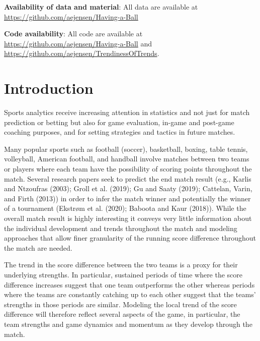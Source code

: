 \documentclass[
  11pt,
]{svjour3}
\theoremstyle{nonumberplain}
\begin{document}
\textbf{Availability of data and material}: All data are available at
\url{https://github.com/aejensen/Having-a-Ball}

\textbf{Code availability}: All code are available at
\url{https://github.com/aejensen/Having-a-Ball} and
\url{https://github.com/aejensen/TrendinessOfTrends}.

\newpage

\hypertarget{introduction}{%
\section{Introduction}\label{introduction}}

Sports analytics receive increasing attention in statistics and not just
for match prediction or betting but also for game evaluation, in-game
and post-game coaching purposes, and for setting strategies and tactics
in future matches.

Many popular sports such as football (soccer), basketball, boxing, table
tennis, volleyball, American football, and handball involve matches
between two teams or players where each team have the possibility of
scoring points throughout the match. Several research papers seek to
predict the end match result (e.g., Karlis and Ntzoufras (2003); Groll
et al. (2019); Gu and Saaty (2019); Cattelan, Varin, and Firth (2013))
in order to infer the match winner and potentially the winner of a
tournament (Ekstrøm et al. (2020); Baboota and Kaur (2018)). While the
overall match result is highly interesting it conveys very little
information about the individual development and trends throughout the
match and modeling approaches that allow finer granularity of the
running score difference throughout the match are needed.

The trend in the score difference between the two teams is a proxy for
their underlying strengths. In particular, sustained periods of time
where the score difference increases suggest that one team outperforms
the other whereas periods where the teams are constantly catching up to
each other suggest that the teams' strengths in those periods are
similar. Modeling the local trend of the score difference will therefore
reflect several aspects of the game, in particular, the team strengths
and game dynamics and momentum as they develop through the match.
\end{document}
